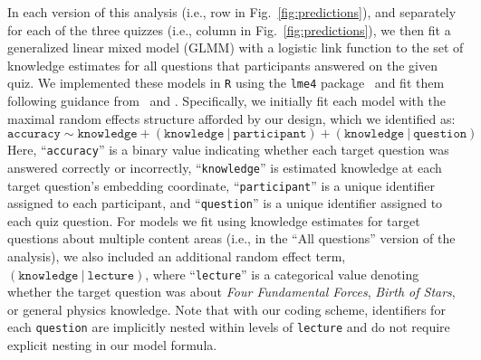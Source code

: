 \documentclass[10pt]{article}
\begin{document}
In each version of this analysis (i.e., row in Fig.~\ref{fig:predictions}), and separately for each of the three quizzes (i.e., column in Fig.~\ref{fig:predictions}),  we then fit a generalized linear mixed model (GLMM) with a logistic link function to the set of knowledge estimates for all questions that participants answered on the given quiz.
We implemented these models in \texttt{R} using the \texttt{lme4} package~\citep{BateEtal15a} and fit them following guidance from~\citet{BateEtal15b} and \citet{MatuEtal17}. Specifically, we initially fit each model with the maximal random effects structure afforded by our design, which we identified as:
\[
    \mathtt{accuracy \sim knowledge + (knowledge\ \vert\ participant) + (knowledge\ \vert\ question)}
\]
Here, ``\texttt{accuracy}'' is a binary value indicating whether each target question was answered correctly or incorrectly, ``\texttt{knowledge}'' is estimated knowledge at each target question's embedding coordinate, ``\texttt{participant}'' is a unique identifier assigned to each participant, and ``\texttt{question}'' is a unique identifier assigned to each quiz question.
For models we fit using knowledge estimates for target questions about multiple content areas (i.e., in the ``All questions'' version of the analysis), we also included an additional random effect term, $\mathtt{(knowledge\ \vert\ lecture)}$, where ``\texttt{lecture}'' is a categorical value denoting whether the target question was about \textit{Four Fundamental Forces}, \textit{Birth of Stars}, or general physics knowledge.
Note that with our coding scheme, identifiers for each \texttt{question} are implicitly nested within levels of \texttt{lecture} and do not require explicit nesting in our model formula.
\end{document}
